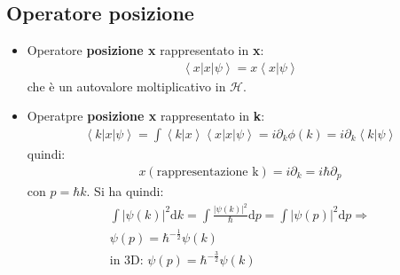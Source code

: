 \subsection{Operatore posizione} %
\begin{itemize}
\item Operatore \textbf{posizione x} rappresentato in \textbf{x}:
\begin{equation}\begin{split}
\left\langle x|x|\psi  \right\rangle=x\left\langle x|\psi  \right\rangle
\end{split}\end{equation}
che è un autovalore moltiplicativo in $\mathcal{H}$.
\item Operatpre \textbf{posizione x} rappresentato in \textbf{k}:
\begin{equation}\begin{split}
\left\langle k|x|\psi  \right\rangle=\int{\left\langle k|x \right\rangle\left\langle x|x|\psi  \right\rangle}=i\partial _k\phi\left(k\right)=i\partial _k\left\langle k|\psi  \right\rangle
\end{split}\end{equation}
quindi:\begin{equation}\begin{split}
x\left(\textrm{rappresentazione k}\right)=i\partial _k=i\hbar \partial _p
\end{split}\end{equation}
con $p=\hbar k$. Si ha quindi:
\begin{equation}\begin{split}
\int{|\psi \left(k\right)|^2\textrm{d}k}=\int{\frac{|\psi \left(k\right)|^2}{\hbar }\textrm{d}p}=\int{|\psi \left(p\right)|^2\textrm{d}p} \Longrightarrow \\
\psi \left(p\right)=\hbar ^{-\frac{1}{2}}\psi \left(k\right) \\
\textrm{in 3D: } \psi \left(p\right)=\hbar ^{-\frac{3}{2}}\psi \left(k\right)
\end{split}\end{equation}
\end{itemize}